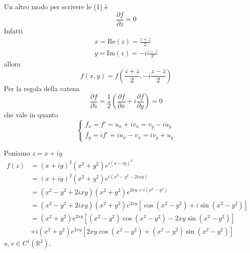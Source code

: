 \begin{rem}
Un altro modo per scrivere le (1) è
\begin{equation*}
\frac{\partial f}{\partial \overline{z}} =0
\end{equation*}
Infatti
\begin{equation*}
\begin{array}{ l }
x=\mathrm{Re}\left( z\right) =\frac{z+\overline{z}}{2}\\
y=\mathrm{Im}\left( z\right) =-i\frac{z-\overline{z}}{2}
\end{array}
\end{equation*}
allora
\begin{equation*}
f\left( x,y\right) =f\left(\frac{z+\overline{z}}{2} ,-i\frac{z-\overline{z}}{2}\right)
\end{equation*}
Per la regola della catena
\begin{equation*}
\frac{\partial f}{\partial \overline{z}} =\frac{1}{2}\left(\frac{\partial f}{\partial x} +i\frac{\partial f}{\partial y}\right) =0
\end{equation*}
che vale in quanto
\begin{equation*}
\begin{cases}
f_{x} =f'=u_{x} +iv_{x} =v_{y} -iu_{y}\\
f_{y} =if'=iu_{x} -v_{x} =iv_{y} +u_{y}
\end{cases}
\end{equation*}
\end{rem}
Poniamo $z=x+iy$
\begin{align*}
f\left( z\right) & =\left( x+iy\right)^{2}\left( x^{2} +y^{2}\right) e^{i\left( x-iy\right)^{2}}\\
 & =\left( x+iy\right)^{2}\left( x^{2} +y^{2}\right) e^{i\left( x^{2} -y^{2} -2ixy\right)}\\
 & =\left( x^{2} -y^{2} +2ixy\right)\left( x^{2} +y^{2}\right) e^{2xy+i\left( x^{2} -y^{2}\right)}\\
 & =\left( x^{2} -y^{2} +2ixy\right)\left( x^{2} +y^{2}\right) e^{2xy}\left[\cos\left( x^{2} -y^{2}\right) +i\sin\left( x^{2} -y^{2}\right)\right]\\
 & =\left( x^{2} +y^{2}\right) e^{2xy}\left[\left( x^{2} -y^{2}\right)\cos\left( x^{2} -y^{2}\right) -2xy\sin\left( x^{2} -y^{2}\right)\right]\\
 & +i\left( x^{2} +y^{2}\right) e^{2xy}\left[ 2xy\cos\left( x^{2} -y^{2}\right) +\left( x^{2} -y^{2}\right)\sin\left( x^{2} -y^{2}\right)\right]
\end{align*}
$u,v\in C^{1}\left(\mathbb{R}^{2}\right)$.

